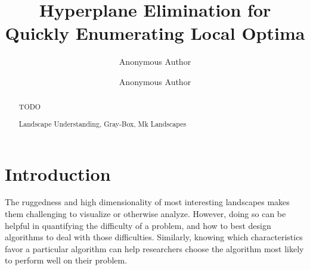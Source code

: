 \documentclass[runningheads,a4paper]{llncs}
\newcommand{\keywords}[1]{\par\addvspace\baselineskip
\noindent\keywordname\enspace\ignorespaces#1}
\begin{document}
\mainmatter  %

\title{Hyperplane Elimination for Quickly Enumerating Local Optima}


%
%
\author{Anonymous Author\and Anonymous Author}

%


%
%

\maketitle


\begin{abstract}
TODO

\keywords{Landscape Understanding, Gray-Box, Mk Landscapes}
\end{abstract}


\section{Introduction}
The ruggedness and high dimensionality of most interesting landscapes makes them challenging
to visualize or otherwise analyze. However, doing so can be helpful in
quantifying the difficulty of a problem, and how to best design algorithms to deal
with those difficulties. 
Similarly, knowing which characteristics favor
a particular
algorithm can help researchers choose the algorithm
most likely to perform well on their problem.
\end{document}
